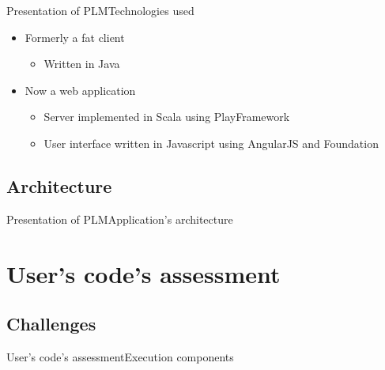 \documentclass{beamer}
\begin{document}
\begin{frame}{Presentation of PLM}{Technologies used}
  \begin{itemize}
    \item {
      Formerly a fat client
      \begin{itemize} 
        \item { Written in Java }
      \end{itemize}
    }
    \item {
      Now a web application
      \begin{itemize}
        \item { Server implemented in Scala using PlayFramework }
        \item { User interface written in Javascript using AngularJS and Foundation}
      \end{itemize}
    }
  \end{itemize}
\end{frame}

\subsection{Architecture}

\begin{frame}{Presentation of PLM}{Application's architecture}
\end{frame}

\section{User's code's assessment}

\subsection{Challenges}

\begin{frame}{User's code's assessment}{Execution components}

\end{frame}
\end{document}
